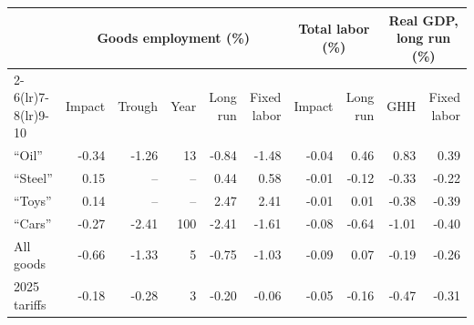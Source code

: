 \begin{tabular}{lrrrrrrrrr}
\toprule
 & \multicolumn{5}{c}{Goods employment (\%)} & \multicolumn{2}{c}{Total labor (\%)} & \multicolumn{2}{c}{Real GDP, long run (\%)} \\
\cmidrule(lr){2-6}\cmidrule(lr){7-8}\cmidrule(lr){9-10}
 & Impact & Trough & Year & Long run & Fixed labor & Impact & Long run & GHH & Fixed labor \\
\midrule
``Oil'' & -0.34 & -1.26 & 13 & -0.84 & -1.48 & -0.04 & 0.46 & 0.83 & 0.39 \\
``Steel'' & 0.15 & -- & -- & 0.44 & 0.58 & -0.01 & -0.12 & -0.33 & -0.22 \\
``Toys'' & 0.14 & -- & -- & 2.47 & 2.41 & -0.01 & 0.01 & -0.38 & -0.39 \\
``Cars'' & -0.27 & -2.41 & 100 & -2.41 & -1.61 & -0.08 & -0.64 & -1.01 & -0.40 \\
\midrule
All goods & -0.66 & -1.33 & 5 & -0.75 & -1.03 & -0.09 & 0.07 & -0.19 & -0.26 \\
\midrule
2025 tariffs & -0.18 & -0.28 & 3 & -0.20 & -0.06 & -0.05 & -0.16 & -0.47 & -0.31 \\
\bottomrule
\end{tabular}
